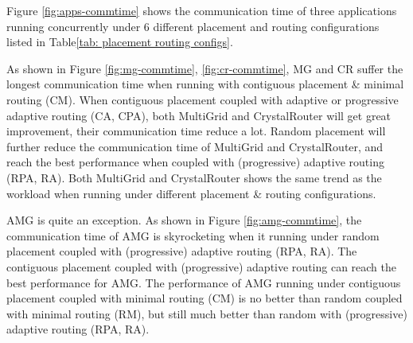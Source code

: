 \documentclass[conference,compsoc]{IEEEtran}
\begin{document}
Figure \ref{fig:apps-commtime} shows the communication time of three applications running concurrently under 6 different placement and routing configurations listed in Table\ref{tab: placement routing configs}.

As shown in Figure \ref{fig:mg-commtime}, \ref{fig:cr-commtime}, MG and CR suffer the longest communication time when running with contiguous placement \& minimal routing (CM). When contiguous placement coupled with adaptive or progressive adaptive routing (CA, CPA), both MultiGrid and CrystalRouter will get great improvement, their communication time reduce a lot. Random placement will further reduce the communication time of MultiGrid and CrystalRouter, and reach the best performance when coupled with (progressive) adaptive routing (RPA, RA). Both MultiGrid and CrystalRouter shows the same trend as the workload when running under different placement \& routing configurations. 

AMG is quite an exception. As shown in Figure \ref{fig:amg-commtime}, the communication time of AMG is skyrocketing when it running under random placement coupled with (progressive) adaptive routing (RPA, RA). The contiguous placement coupled with (progressive) adaptive routing can reach the best performance for AMG. The performance of AMG running under contiguous placement coupled with minimal routing (CM) is no better than random coupled with minimal routing (RM), but still much better than random with (progressive) adaptive routing (RPA, RA). 
\end{document}
